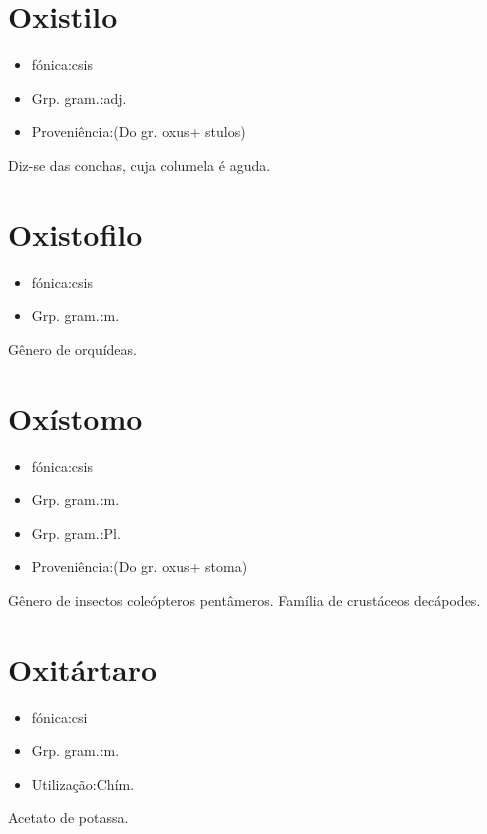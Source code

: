 \section{Oxistilo}
\begin{itemize}
\item {fónica:csis}
\end{itemize}
\begin{itemize}
\item {Grp. gram.:adj.}
\end{itemize}
\begin{itemize}
\item {Proveniência:(Do gr. \textunderscore oxus\textunderscore  + \textunderscore stulos\textunderscore )}
\end{itemize}
Diz-se das conchas, cuja columela é aguda.
\section{Oxistofilo}
\begin{itemize}
\item {fónica:csis}
\end{itemize}
\begin{itemize}
\item {Grp. gram.:m.}
\end{itemize}
Gênero de orquídeas.
\section{Oxístomo}
\begin{itemize}
\item {fónica:csis}
\end{itemize}
\begin{itemize}
\item {Grp. gram.:m.}
\end{itemize}
\begin{itemize}
\item {Grp. gram.:Pl.}
\end{itemize}
\begin{itemize}
\item {Proveniência:(Do gr. \textunderscore oxus\textunderscore  + \textunderscore stoma\textunderscore )}
\end{itemize}
Gênero de insectos coleópteros pentâmeros.
Família de crustáceos decápodes.
\section{Oxitártaro}
\begin{itemize}
\item {fónica:csi}
\end{itemize}
\begin{itemize}
\item {Grp. gram.:m.}
\end{itemize}
\begin{itemize}
\item {Utilização:Chím.}
\end{itemize}
Acetato de potassa.
